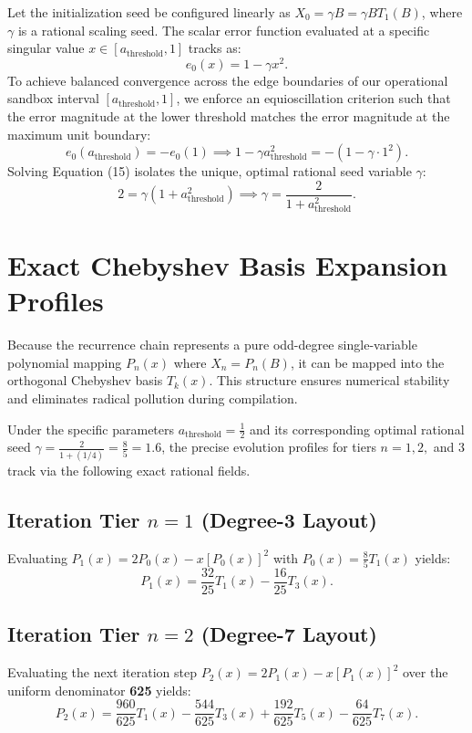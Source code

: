 \documentclass[11pt,a4paper]{article}
\begin{document}
Let the initialization seed be configured linearly as $X_0 = \gamma B = \gamma B T_1(B)$, where $\gamma$ is a rational scaling seed. The scalar error function evaluated at a specific singular value $x \in [a_{\text{threshold}}, 1]$ tracks as:
\begin{equation}
e_0(x) = 1 - \gamma x^2.
\end{equation}
To achieve balanced convergence across the edge boundaries of our operational sandbox interval $[a_{\text{threshold}}, 1]$, we enforce an equioscillation criterion such that the error magnitude at the lower threshold matches the error magnitude at the maximum unit boundary:
\begin{equation}
e_0(a_{\text{threshold}}) = -e_0(1) \implies 1 - \gamma a_{\text{threshold}}^2 = - (1 - \gamma \cdot 1^2).
\end{equation}
Solving Equation (15) isolates the unique, optimal rational seed variable $\gamma$:
\begin{equation}
2 = \gamma(1 + a_{\text{threshold}}^2) \implies \gamma = \frac{2}{1 + a_{\text{threshold}}^2}.
\end{equation}

\section{Exact Chebyshev Basis Expansion Profiles}
Because the recurrence chain represents a pure odd-degree single-variable polynomial mapping $P_n(x)$ where $X_n = P_n(B)$, it can be mapped into the orthogonal Chebyshev basis $T_k(x)$. This structure ensures numerical stability and eliminates radical pollution during compilation.

Under the specific parameters $a_{\text{threshold}} = \frac{1}{2}$ and its corresponding optimal rational seed $\gamma = \frac{2}{1 + (1/4)} = \frac{8}{5} = 1.6$, the precise evolution profiles for tiers $n=1, 2,$ and $3$ track via the following exact rational fields.

\subsection{Iteration Tier $n=1$ (Degree-3 Layout)}
Evaluating $P_1(x) = 2P_0(x) - x [P_0(x)]^2$ with $P_0(x) = \frac{8}{5}T_1(x)$ yields:
\begin{equation}
P_1(x) = \frac{32}{25}T_1(x) - \frac{16}{25}T_3(x).
\end{equation}

\subsection{Iteration Tier $n=2$ (Degree-7 Layout)}
Evaluating the next iteration step $P_2(x) = 2P_1(x) - x [P_1(x)]^2$ over the uniform denominator \textbf{625} yields:
\begin{equation}
P_2(x) = \frac{960}{625}T_1(x) - \frac{544}{625}T_3(x) + \frac{192}{625}T_5(x) - \frac{64}{625}T_7(x).
\end{equation}
\end{document}
